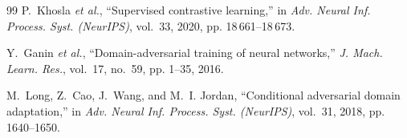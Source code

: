 \documentclass[journal,onecolumn]{IEEEtran}
\begin{document}
{\begin{thebibliography}{99}
P.~Khosla \emph{et al.}, ``Supervised contrastive learning,'' in \emph{Adv. Neural Inf. Process. Syst. (NeurIPS)}, vol.~33, 2020, pp. 18\,661--18\,673.

Y.~Ganin \emph{et al.}, ``Domain-adversarial training of neural networks,'' \emph{J. Mach. Learn. Res.}, vol.~17, no.~59, pp. 1--35, 2016.

M.~Long, Z.~Cao, J.~Wang, and M.~I. Jordan, ``Conditional adversarial domain adaptation,'' in \emph{Adv. Neural Inf. Process. Syst. (NeurIPS)}, vol.~31, 2018, pp. 1640--1650.

\end{thebibliography}
}
\end{document}
